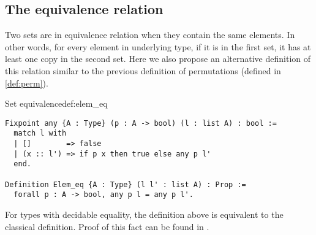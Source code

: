 \subsection{The equivalence relation}
Two sets are in equivalence relation when they contain the same elements. In other words, for every element in underlying type, if it is in the first set, it has at least one copy in the second set. Here we also propose an alternative definition of this relation similar to the previous definition of permutations (defined in \ref{def:perm}).
\begin{defi}{Set equivalence}{def:elem_eq}
\begin{verbatim}
Fixpoint any {A : Type} (p : A -> bool) (l : list A) : bool :=
  match l with
  | []        => false
  | (x :: l') => if p x then true else any p l'
  end.

Definition Elem_eq {A : Type} (l l' : list A) : Prop := 
  forall p : A -> bool, any p l = any p l'.
\end{verbatim}
\end{defi}
For types with decidable equality, the definition above is equivalent to the classical definition. Proof of this fact can be found in .
